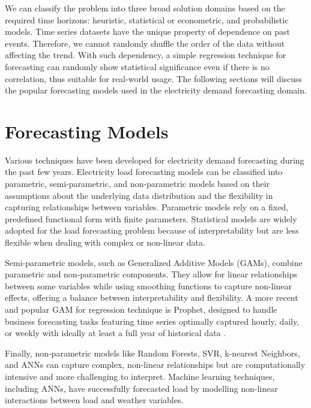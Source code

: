 \documentclass[mstat,12pt]{unswthesis}
\begin{document}
We can classify the problem into three broad solution domains based on
the required time horizons: heuristic, statistical or econometric, and
probabilistic models. Time series datasets have the unique property of
dependence on past events. Therefore, we cannot randomly shuffle the
order of the data without affecting the trend. With such dependency, a
simple regression technique for forecasting can randomly show
statistical significance even if there is no correlation, thus suitable
for real-world usage. The following sections will discuss the popular
forecasting models used in the electricity demand forecasting domain.

\hypertarget{forecasting-models}{%
\section{Forecasting Models}\label{forecasting-models}}

Various techniques have been developed for electricity demand
forecasting during the past few years. Electricity load forecasting
models can be classified into parametric, semi-parametric, and
non-parametric models based on their assumptions about the underlying
data distribution and the flexibility in capturing relationships between
variables. Parametric models rely on a fixed, predefined functional form
with finite parameters. Statistical models are widely adopted for the
load forecasting problem because of interpretability but are less
flexible when dealing with complex or non-linear data\cite{Fan2012}.

Semi-parametric models, such as Generalized Additive Models (GAMs),
combine parametric and non-parametric components. They allow for linear
relationships between some variables while using smoothing functions to
capture non-linear effects, offering a balance between interpretability
and flexibility. A more recent and popular GAM for regression technique
is Prophet, designed to handle business forecasting tasks featuring time
series optimally captured hourly, daily, or weekly with ideally at least
a full year of historical data \cite{taylor2017facebook}.

Finally, non-parametric models like Random Forests, SVR, k-nearest
Neighbors, and ANNs can capture complex, non-linear relationships but
are computationally intensive and more challenging to interpret. Machine
learning techniques, including ANNs, have successfully forecasted load
by modelling non-linear interactions between load and weather variables.
\end{document}
